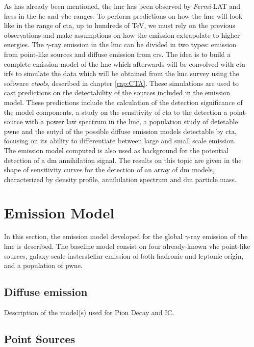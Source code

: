 \documentclass[main.tex]{subfiles}
\begin{document}
As has already been mentioned, the \gls{lmc} has been observed by \textit{Fermi}-LAT and \gls{hess} in the \gls{he} and \gls{vhe} ranges. To perform predictions on how the \gls{lmc} will look like in the range of \gls{cta}, up to hundreds of TeV, we must rely on the previous observations and make assumptions on how the emission extrapolate to higher energies. The $\gamma$-ray emission in the \gls{lmc} can be divided in two types: emission from point-like sources and diffuse emission from \glspl{cr}. The idea is to build a complete emission model of the \gls{lmc} which afterwards will be convolved with \gls{cta} \glspl{irf} to simulate the data which will be obtained from the \gls{lmc} survey using the software \textit{ctools}, described in chapter \ref{cap:CTA}. These simulations are used to cast predictions on the detectability of the sources included in the emission model. These predictions include the calculation of the detection significance of the model components, a study on the sensitivity of \gls{cta} to the detection a point-source with a power law spectrum in the \gls{lmc}, a population study of detetable \gls{pwne} and the sutyd of the possible diffuse emission models detectable by \gls{cta}, focusing on its ability to differentiate between large and small scale emission.\\
The emission model computed is also used as background for the potential detection of a \gls{dm} annihilation signal. The results on this topic are given in the shape of sensitivity curves for the detection of an array of \gls{dm} models, characterized by density profile, annihilation spectrum and \gls{dm} particle mass.

\section{Emission Model} \label{sec:model}

In this section, the emission model developed for the global $\gamma$-ray emission of the \gls{lmc} is described. The baseline model consist on four already-known \gls{vhe} point-like sources, galaxy-scale insterstellar emission of both hadronic and leptonic origin, and a population of \gls{pwne}. 

\subsection{Diffuse emission}
Description of the model(s) used for Pion Decay and IC.
\subsection{Point Sources}
\end{document}
